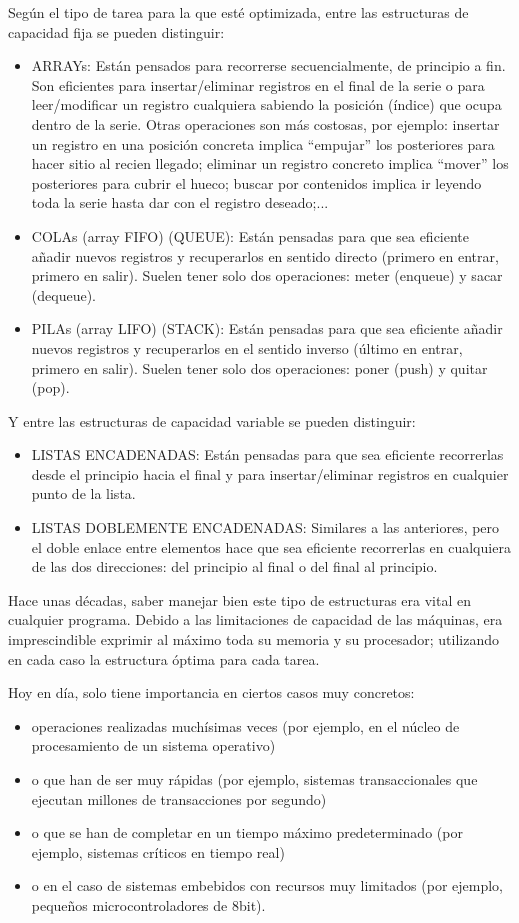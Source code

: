 \documentclass[spanish,12pt,a4paper,final,oneside]{book}
\begin{document}
Según el tipo de tarea para la que esté optimizada, entre las estructuras de capacidad fija se pueden distinguir:
\begin{itemize}
\item ARRAYs: Están pensados para recorrerse secuencialmente, de principio a fin. Son eficientes para insertar/eliminar registros en el final de la serie o para leer/modificar un registro cualquiera sabiendo la posición (índice) que ocupa dentro de la serie. Otras operaciones son más costosas, por ejemplo: insertar un registro en una posición concreta implica ``empujar'' los posteriores para hacer sitio al recien llegado; eliminar un registro concreto implica  ``mover'' los posteriores para cubrir el hueco; buscar por contenidos implica ir leyendo toda la serie hasta dar con el registro deseado;...
\item COLAs (array FIFO) (QUEUE): Están pensadas para que sea eficiente añadir nuevos registros y recuperarlos en sentido directo (primero en entrar, primero en salir). Suelen tener solo dos operaciones: meter (enqueue) y sacar (dequeue).
\item PILAs (array LIFO) (STACK): Están pensadas para que sea eficiente añadir nuevos registros y recuperarlos en el sentido inverso (último en entrar, primero en salir). Suelen tener solo dos operaciones: poner (push) y quitar (pop).
\end{itemize}

Y entre las estructuras de capacidad variable se pueden distinguir:
\begin{itemize}
\item LISTAS ENCADENADAS: Están pensadas para que sea eficiente recorrerlas desde el principio hacia el final y para insertar/eliminar registros en cualquier punto de la lista.
\item LISTAS DOBLEMENTE ENCADENADAS: Similares a las anteriores, pero el doble enlace entre elementos hace que sea eficiente recorrerlas en cualquiera de las dos direcciones: del principio al final o del final al principio.
\end{itemize}

Hace unas décadas, saber manejar bien este tipo de estructuras era vital en cualquier programa. Debido a las limitaciones de capacidad de las máquinas, era imprescindible exprimir al máximo toda su memoria y su procesador; utilizando en cada caso la estructura óptima para cada tarea.

Hoy en día, solo tiene importancia en ciertos casos muy concretos:
\begin{itemize}
\item operaciones realizadas muchísimas veces (por ejemplo, en el núcleo de procesamiento de un sistema operativo) 
\item o que han de ser muy rápidas (por ejemplo,  sistemas transaccionales que ejecutan millones de transacciones por segundo) \item o que se han de completar en un tiempo máximo predeterminado (por ejemplo, sistemas críticos en tiempo real) 
\item o en el caso de sistemas embebidos con recursos muy limitados (por ejemplo, pequeños microcontroladores de 8bit).
\end{itemize}
\end{document}
